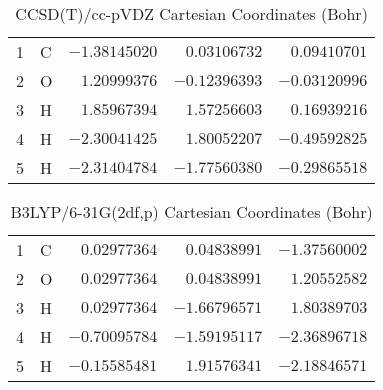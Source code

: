 \documentclass[10pt,oneside]{article}
\begin{document}
\begin{table}[h!]
\centering
\caption{CCSD(T)/cc-pVDZ Cartesian Coordinates (Bohr)}
\begin{tabular}{llrrr}
1  & C  & $-1.38145020$ & $ 0.03106732$ & $ 0.09410701$ \\
2  & O  & $ 1.20999376$ & $-0.12396393$ & $-0.03120996$ \\
3  & H  & $ 1.85967394$ & $ 1.57256603$ & $ 0.16939216$ \\
4  & H  & $-2.30041425$ & $ 1.80052207$ & $-0.49592825$ \\
5  & H  & $-2.31404784$ & $-1.77560380$ & $-0.29865518$ \\
\end{tabular}
\end{table}

\begin{table}[h!]
\centering
\caption{B3LYP/6-31G(2df,p) Cartesian Coordinates (Bohr)}
\begin{tabular}{llrrr}
1  & C  & $ 0.02977364$ & $ 0.04838991$ & $-1.37560002$ \\
2  & O  & $ 0.02977364$ & $ 0.04838991$ & $ 1.20552582$ \\
3  & H  & $ 0.02977364$ & $-1.66796571$ & $ 1.80389703$ \\
4  & H  & $-0.70095784$ & $-1.59195117$ & $-2.36896718$ \\
5  & H  & $-0.15585481$ & $ 1.91576341$ & $-2.18846571$ \\
\end{tabular}
\end{table}

\clearpage
\end{document}
